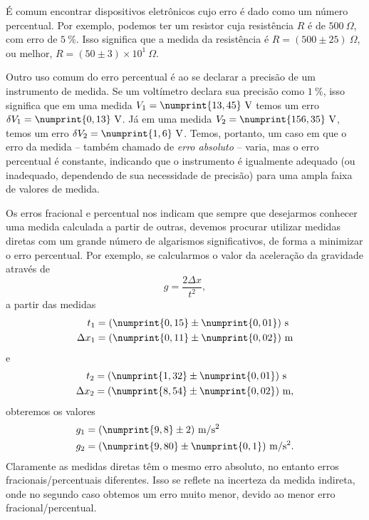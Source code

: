 É comum encontrar dispositivos eletrônicos cujo erro é dado como um número percentual. Por exemplo, podemos ter um resistor cuja resistência $R$ é de $500~\Omega$, com erro de $5~\%$. Isso significa que a medida da resistência é $R = (500 \pm 25)~\Omega$, ou melhor, $R = (50 \pm 3)\times10^1~\Omega$. 

Outro uso comum do erro percentual é ao se declarar a precisão de um instrumento de medida. Se um voltímetro declara sua precisão como $1~\%$, isso significa que em uma medida $V_1 = \numprint{13,45}~\textrm{V}$ temos um erro  $\delta V_1 = \numprint{0,13}~\textrm{V}$. Já em uma medida $V_2 = \numprint{156,35}~\textrm{V}$, temos um erro $\delta V_2 = \numprint{1,6}~\textrm{V}$. Temos, portanto, um caso em que o erro da medida -- também chamado de \emph{erro absoluto} -- varia, mas o erro percentual é constante, indicando que o instrumento é igualmente adequado (ou inadequado, dependendo de sua necessidade de precisão) para uma ampla faixa de valores de medida.

Os erros fracional e percentual nos indicam que sempre que desejarmos conhecer uma medida calculada a partir de outras, devemos procurar utilizar medidas diretas com um grande número de algarismos significativos, de forma a minimizar o erro percentual. Por exemplo, se calcularmos o valor da aceleração da gravidade através de
\begin{equation}
	g = \frac{2\Delta x}{t^2},
\end{equation}
%
a partir das medidas 
\begin{align}
	t_1 &= (\numprint{0,15} \pm \numprint{0,01})~\textrm{s} \\
	\Delta x_1 &= (\numprint{0,11} \pm \numprint{0,02})~\textrm{m}
\end{align}
%
e
\begin{align}
	t_2 &= (\numprint{1,32} \pm \numprint{0,01})~\textrm{s} \\
	\Delta x_2 &= (\numprint{8,54} \pm \numprint{0,02})~\textrm{m},
\end{align}
%
obteremos os valores
\begin{align}
	g_1 &= (\numprint{9,8} \pm 2)~\textrm{m}/\textrm{s}^2 \\
	g_2 &= (\numprint{9,80} \pm \numprint{0,1})~\textrm{m}/\textrm{s}^2.
\end{align}
%
Claramente as medidas diretas têm o mesmo erro absoluto, no entanto erros fracionais/percentuais diferentes. Isso se reflete na incerteza da medida indireta, onde no segundo caso obtemos um erro muito menor, devido ao menor erro fracional/percentual.

